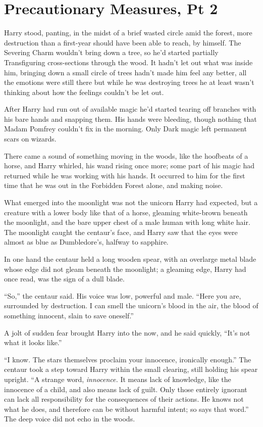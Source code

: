 \chapter{Precautionary Measures, Pt
2}\label{precautionary-measures-pt-2}

Harry stood, panting, in the midst of a brief wasted circle amid the
forest, more destruction than a first-year should have been able to
reach, by himself. The Severing Charm wouldn't bring down a tree, so
he'd started partially Transfiguring cross-sections through the wood. It
hadn't let out what was inside him, bringing down a small circle of
trees hadn't made him feel any better, all the emotions were still there
but while he was destroying trees he at least wasn't thinking about how
the feelings couldn't be let out.

After Harry had run out of available magic he'd started tearing off
branches with his bare hands and snapping them. His hands were bleeding,
though nothing that Madam Pomfrey couldn't fix in the morning. Only Dark
magic left permanent scars on wizards.

There came a sound of something moving in the woods, like the hoofbeats
of a horse, and Harry whirled, his wand rising once more; some part of
his magic had returned while he was working with his hands. It occurred
to him for the first time that he was out in the Forbidden Forest alone,
and making noise.

What emerged into the moonlight was not the unicorn Harry had expected,
but a creature with a lower body like that of a horse, gleaming
white-brown beneath the moonlight, and the bare upper chest of a male
human with long white hair. The moonlight caught the centaur's face, and
Harry saw that the eyes were almost as blue as Dumbledore's, halfway to
sapphire.

In one hand the centaur held a long wooden spear, with an overlarge
metal blade whose edge did not gleam beneath the moonlight; a gleaming
edge, Harry had once read, was the sign of a dull blade.

``So,'' the centaur said. His voice was low, powerful and male. ``Here
you are, surrounded by destruction. I can smell the unicorn's blood in
the air, the blood of something innocent, slain to save oneself.''

A jolt of sudden fear brought Harry into the now, and he said quickly,
``It's not what it looks like.''

``I know. The stars themselves proclaim your innocence, ironically
enough.'' The centaur took a step toward Harry within the small
clearing, still holding his spear upright. ``A strange word,
\emph{innocence.} It means lack of knowledge, like the innocence of a
child, and also means lack of guilt. Only those entirely ignorant can
lack all responsibility for the consequences of their actions. He knows
not what he does, and therefore can be without harmful intent; so says
that word.'' The deep voice did not echo in the woods.

